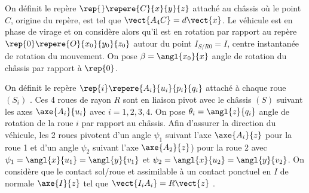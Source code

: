 On définit le repère $\rep{}\repere{C}{x}{y}{z}$ attaché au châssis où le point $C$, origine du repère, est tel que 
$\vect{A_4 C}= d\vect{x}$. Le véhicule est en phase de virage et on considère alors qu’il est en rotation par rapport au
repère $\rep{0}\repere{O}{x_0}{y_0}{z_0}$ autour du point $I_{S/R0} = I$, centre instantanée de rotation du mouvement. On pose $\beta=\angl{x_0}{x}$  angle de rotation du châssis par rapport à $\rep{0}$. 

On définit le repère $\rep{i}\repere{A_i}{u_i}{p_i}{q_i}$ attaché à chaque roue $(S_i)$ . Ces 4 roues de rayon $R$ sont en
liaison pivot avec le châssis $(S)$ suivant les axes $\axe{A_i}{u_i}$ avec 
$i=1,2,3,4$. On pose $\theta_i=\angl{z}{q_i}$ angle de rotation de la roue $i$ par rapport au châssis. 
Afin d’assurer la direction du véhicule, les 2 roues pivotent d’un angle $\psi_1$ suivant l’axe $\axe{A_i}{z}$ pour la roue 1 et d’un angle $\psi_2$ suivant l’axe $\axe{A_2}{z}$) pour la roue 2 avec $\psi_1=\angl{x}{u_1}=\angl{y}{v_1}$ et $\psi_2=\angl{x}{u_2}=\angl{y}{v_2}$. 
On considère que le contact sol/roue et assimilable à un contact ponctuel en $I$ de normale $\axe{I}{z}$ tel que $\vect{I_i A_i}=R\vect{z}$ .  



\ifprof%
\begin{corrige}
\end{corrige}\else\fi

\ifprof%
\begin{corrige}
\end{corrige}\else\fi

\ifprof%
\begin{corrige}
\end{corrige}\else\fi

\ifprof%
\begin{corrige}
\end{corrige}\else\fi

